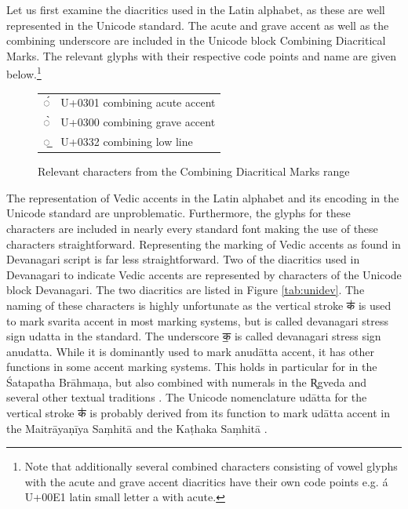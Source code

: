 Let us first examine the diacritics used in the Latin alphabet, as these are well represented in the Unicode standard. The acute and grave accent as well as the combining underscore are included in the Unicode block Combining Diacritical Marks. The relevant glyphs with their respective code points and name are given below.\footnote{Note that additionally several combined characters consisting of vowel glyphs with the acute and grave accent diacritics have their own code points e.g. á U+00E1 {\sc latin small letter a with acute}.}

\begin{figure}[!ht]
\begin{center}
\begin{tabular}{ll}
  ◌́& U+0301 {\sc combining acute accent}\\
  ◌̀& U+0300 {\sc combining grave accent}\\
  ◌̲& U+0332 {\sc combining low line}
\end{tabular}
\end{center}
\caption[Relevant characters from the Combining Diacritical Marks range]{\label{tab:unilat}Relevant characters from the Combining Diacritical Marks range}
\end{figure}

The representation of Vedic accents in the Latin alphabet and its encoding in the Unicode standard are unproblematic. Furthermore, the glyphs for these characters are included in nearly every standard font making the use of these characters straightforward. Representing the marking of Vedic accents as found in Devanagari script is far less straightforward. Two of the diacritics used in Devanagari to indicate Vedic accents are represented by characters of the Unicode block Devanagari. The two diacritics are listed in Figure \ref{tab:unidev}. The naming of these characters is highly unfortunate as the vertical stroke {\devfont क॑} is used to mark svarita accent in most marking systems, but is called {\sc devanagari stress sign udatta} in the standard. The underscore {\devfont क॒} is called {\sc devanagari stress sign anudatta}. While it is dominantly used to mark anudātta accent, it has other functions in some accent marking systems. This holds in particular for in the Śatapatha Brāhmaṇa, but also combined with numerals in the R̥gveda and several other textual traditions \citep[p.~159]{ScharfHyman2011}. The Unicode nomenclature udātta for the vertical stroke {\devfont क॑} is probably derived from its function to mark udātta accent in the Maitrāyaṇīya Saṃhitā and the Kaṭhaka Saṃhitā \citep[p.~450]{Macdonell1916}.

